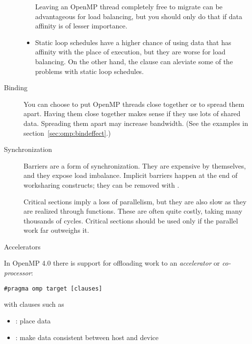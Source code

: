 \begin{description}
\begin{itemize}
    Leaving an OpenMP thread completely free to migrate can be
    advantageous for load balancing, but you should only do that if
    data affinity is of lesser importance.
  \item Static loop schedules have a higher chance of using data that
    has affinity with the place of execution, but they are worse for
    load balancing. On the other hand, the  clause
    can aleviate some of the problems with static loop schedules.
  \end{itemize}
\item[Binding] You can choose to put OpenMP threads close together or
  to spread them apart. Having them close together makes sense if they
  use lots of shared data. Spreading them apart may increase
  bandwidth. (See the examples in section~\ref{sec:omp:bindeffect}.)
\item[Synchronization] Barriers are a form of synchronization. They
  are expensive by themselves, and they expose load
  imbalance. Implicit barriers happen at the end of worksharing
  constructs; they can be removed with .

  Critical sections imply a loss of parallelism, but they are also
  slow as they are realized through 
  functions. These are often quite costly, taking many thousands of
  cycles.  Critical sections should be used only if the parallel work
  far outweighs it.
\end{description}

 {Accelerators}

In OpenMP 4.0 there is support for offloading work to an
\emph{accelerator}
or
\emph{co-processor}:
\begin{lstlisting}
#pragma omp target [clauses]
\end{lstlisting}
with clauses such as
\begin{itemize}
\item {}: place data
\item {}: make data consistent between host and device
\end{itemize}

\endinput

\Level 0 {Idioms}

\Level 1 {While loops}

\verbatimsnippet{linkedlist}

